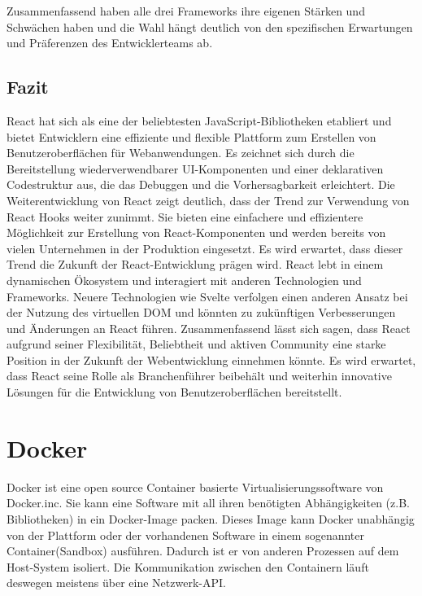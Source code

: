 Zusammenfassend haben alle drei Frameworks ihre eigenen Stärken und Schwächen haben und die Wahl hängt deutlich von den spezifischen Erwartungen und Präferenzen des Entwicklerteams ab.

\subsection{Fazit}
React hat sich als eine der beliebtesten JavaScript-Bibliotheken etabliert und bietet Entwicklern eine effiziente und flexible Plattform zum Erstellen von Benutzeroberflächen für Webanwendungen. Es zeichnet sich durch die Bereitstellung wiederverwendbarer UI-Komponenten und einer deklarativen Codestruktur aus, die das Debuggen und die Vorhersagbarkeit erleichtert. 
Die Weiterentwicklung von React zeigt deutlich, dass der Trend zur Verwendung von React Hooks weiter zunimmt. Sie bieten eine einfachere und effizientere Möglichkeit zur Erstellung von React-Komponenten  und werden bereits von vielen Unternehmen in der Produktion eingesetzt. Es wird erwartet, dass dieser Trend die Zukunft der React-Entwicklung  prägen wird.  React lebt in einem dynamischen Ökosystem und interagiert mit anderen Technologien und Frameworks. Neuere Technologien wie Svelte verfolgen einen anderen Ansatz bei der Nutzung des virtuellen DOM und könnten zu zukünftigen Verbesserungen und Änderungen an React führen. 
Zusammenfassend lässt sich sagen, dass React aufgrund seiner Flexibilität, Beliebtheit und aktiven Community  eine starke Position in der Zukunft der Webentwicklung einnehmen könnte. Es wird erwartet, dass React seine Rolle als Branchenführer beibehält und weiterhin innovative Lösungen für die Entwicklung von Benutzeroberflächen bereitstellt.

\section{Docker}

\begin{figure}
	\centering
\end{figure}

Docker ist eine open source Container basierte Virtualisierungssoftware von Docker.inc.
Sie kann eine Software mit all ihren benötigten Abhängigkeiten (z.B. Bibliotheken) in ein Docker-Image packen. Dieses Image kann Docker unabhängig von der Plattform oder der vorhandenen Software in einem sogenannter Container(Sandbox) ausführen. Dadurch ist er von anderen Prozessen auf dem Host-System isoliert. Die Kommunikation zwischen den Containern läuft deswegen meistens über eine Netzwerk-API.

